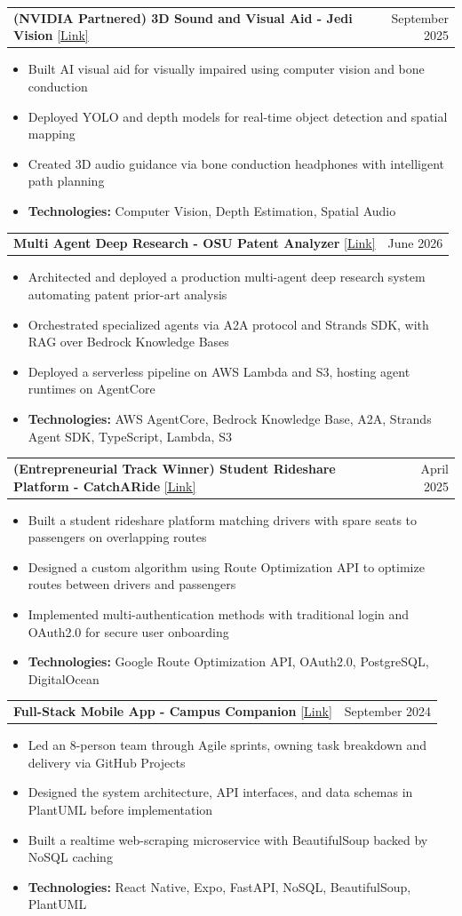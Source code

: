 \documentclass[letterpaper,11pt]{article}
\makeatletter
\newcommand{\resumeItem}[1]{%
\item\small{%
    {#1\vspace{-2pt}}%
  }%
}
\newcommand{\resumeProjectHeading}[2]{
\item
  \begin{tabular*}{0.97\textwidth}{l@{\extracolsep{\fill}}r}
    \small#1 & #2 \\
  \end{tabular*}\vspace{-7pt}
}
\newcommand{\resumeItemListStart}{
\begin{itemize}}
\newcommand{\resumeItemListEnd}{
\end{itemize}\vspace{-5pt}}
\makeatother
\begin{document}
\resumeProjectHeading
{\textbf{(NVIDIA Partnered) 3D Sound and Visual Aid - Jedi Vision} \href{https://github.com/Jedi-Vision/jedi-vision-nano-code}{[Link]}}{September 2025}
\resumeItemListStart
\resumeItem{Built AI visual aid for visually impaired using computer vision and bone conduction}
\resumeItem{Deployed YOLO and depth models for real-time object detection and spatial mapping}
\resumeItem{Created 3D audio guidance via bone conduction headphones with intelligent path planning}
\resumeItem{\textbf{Technologies:} Computer Vision, Depth Estimation, Spatial Audio}
\resumeItemListEnd

\resumeProjectHeading
{\textbf{Multi Agent Deep Research - OSU Patent Analyzer} \href{https://github.com/aj-arts/aime-fullstack}{[Link]}}{June 2026}
\resumeItemListStart
\resumeItem{Architected and deployed a production multi-agent deep research system automating patent prior-art analysis}
\resumeItem{Orchestrated specialized agents via A2A protocol and Strands SDK, with RAG over Bedrock Knowledge Bases}
\resumeItem{Deployed a serverless pipeline on AWS Lambda and S3, hosting agent runtimes on AgentCore}
\resumeItem{\textbf{Technologies:} AWS AgentCore, Bedrock Knowledge Base, A2A, Strands Agent SDK, TypeScript, Lambda, S3}
\resumeItemListEnd

\resumeProjectHeading
{\textbf{(Entrepreneurial Track Winner) Student Rideshare Platform - CatchARide} \href{https://devpost.com/software/catcharide}{[Link]}}{April 2025}
\resumeItemListStart
\resumeItem{Built a student rideshare platform matching drivers with spare seats to passengers on overlapping routes}
\resumeItem{Designed a custom algorithm using Route Optimization API to optimize routes between drivers and passengers}
\resumeItem{Implemented multi-authentication methods with traditional login and OAuth2.0 for secure user onboarding}
\resumeItem{\textbf{Technologies:} Google Route Optimization API, OAuth2.0, PostgreSQL, DigitalOcean}
\resumeItemListEnd

\resumeProjectHeading
{\textbf{Full-Stack Mobile App - Campus Companion} \href{https://github.com/Carson274/CampusView}{[Link]}}{September 2024}
\resumeItemListStart
\resumeItem{Led an 8-person team through Agile sprints, owning task breakdown and delivery via GitHub Projects}
\resumeItem{Designed the system architecture, API interfaces, and data schemas in PlantUML before implementation}
\resumeItem{Built a realtime web-scraping microservice with BeautifulSoup backed by NoSQL caching}
\resumeItem{\textbf{Technologies:} React Native, Expo, FastAPI, NoSQL, BeautifulSoup, PlantUML}
\resumeItemListEnd
\end{document}
